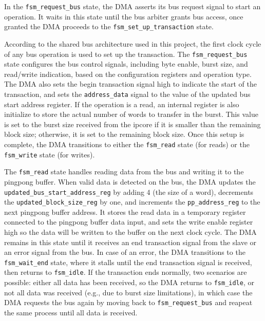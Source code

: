 \documentclass[a4paper,11pt,oneside]{report}
\begin{document}
In the \texttt{fsm\_request\_bus} state, the DMA asserts its bus request signal to start an operation.  
It waits in this state until the bus arbiter grants bus access, once granted the DMA proceeds to the \texttt{fsm\_set\_up\_transaction} state.

According to the shared bus architecture used in this project, the first clock cycle of any bus operation is used to set up the transaction.  
The \texttt{fsm\_request\_bus} state configures the bus control signals, including byte enable, burst size, and read/write indication, based on the configuration registers and operation type.  
The DMA also sets the begin transaction signal high to indicate the start of the transaction,  
and sets the \texttt{address\_data} signal to the value of the updated bus start address register.  
If the operation is a read, an internal register is also initialize to store the actual number of words to transfer in the burst.  
This value is set to the burst size received from the ipcore if it is smaller than the remaining block size; otherwise, it is set to the remaining block size.  
Once this setup is complete, the DMA transitions to either the \texttt{fsm\_read} state (for reads) or the \texttt{fsm\_write} state (for writes).


The \texttt{fsm\_read} state handles reading data from the bus and writing it to the pingpong buffer.  
When valid data is detected on the bus, the DMA updates the \texttt{updated\_bus\_start\_address\_reg} by adding 4 (the size of a word),  
decrements the \texttt{updated\_block\_size\_reg} by one,  
and increments the \texttt{pp\_address\_reg} to the next pingpong buffer address.  
It stores the read data in a temporary register connected to the pingpong buffer data input,  
and sets the write enable register high so the data will be written to the buffer on the next clock cycle.  
The DMA remains in this state until it receives an end transaction signal from the slave or an error signal from the bus.  
In case of an error, the DMA transitions to the \texttt{fsm\_wait\_end} state, where it stalls until the end transaction signal is received, then returns to \texttt{fsm\_idle}.  
If the transaction ends normally, two scenarios are possible:  
either all data has been received, so the DMA returns to \texttt{fsm\_idle},  
or not all data was received (e.g., due to burst size limitations), in which case the DMA requests the bus again by moving back to \texttt{fsm\_request\_bus} and reapeat the same process until all data is received.
\end{document}
